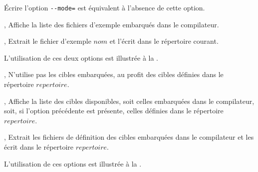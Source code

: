 Écrire l'option \texttt{-{}-mode=} est équivalent à l'absence de cette option.







,  Affiche la liste des fichiers d'exemple embarqués dans le compilateur.

,  Extrait le fichier d'exemple $nom$ et l'écrit dans le répertoire courant.

L'utilisation de ces deux options est illustrée à la .








,  N'utilise pas les cibles embarquées, au profit des cibles définies dans le répertoire $repertoire$.

,  Affiche la liste des cibles disponibles, soit celles embarquées dans le compilateur, soit, si l'option précédente est présente, celles définies dans le répertoire $repertoire$.

,  Extrait les fichiers de définition des cibles embarquées dans le compilateur et les écrit dans le répertoire $repertoire$.

L'utilisation de ces options est illustrée à la .
